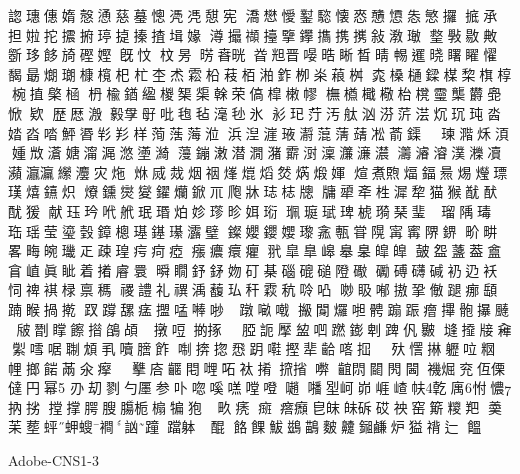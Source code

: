 𧩓璤僡媠慤慂慈𦻒憁凴𠙖憇宪
𣾷𢡟懓𨮝𩥝懐㤲𢦀𢣁怣慜攞
掋𠄘担𡝰拕𢸍捬𤧟㨗搸揸𡎎𡟼
澊𢸶𥜝擡擥鑻㩦携㩗敍漖𤨨
𤨣斅敭敟斵𤥀䬷旑䃘𡠩旣忟
𣐀昘𣇷𣇸晄𣆤𣆥晋𠹵晧𥇦晳晴
𣈱𨗴𣇈𥌓矅𢣷馤朂𤎜𤨡槺𣟂杞
杧杢𤇍𩃭柗䓩栢湐鈼栁𣏦𦶠桝
𣑯槡樋𨫟楳棃𣗍椁椀㨁𣘼㮀
枬楡𨩊䋼椶榘㮡𠏉荣傐槹𣙙𢄪
橅𣜃檝㯳枱櫈𩆜㰍欝𠤣惞欵
歴𢟍溵𣫛𡥘㝀吡𣭚毡𣻼毜氷
𢒋𤣱𦭑汚舦汹𣶼䓅𣶽𤆤𤤌𤤀𣳉
㛥㳫𠴲鮃𣇹𢒑羏样𦴥𦶡𦷫涖
浜湼漄𤥿𤂅𦹲蔳𦽴凇萮𨬡港𣸯
瑓𣾂秌湏媑𣁋濸㜍澝𣸰滺𡒗𤀽
䕕鏰潄潜㵎潴𩅰㴻澟𤅄濓𤂑
𤅕𤀹𣿰𣾴𤄿凟𤅖𤅗𤅀𦇝灋灾炧
烌烕烖烟䄄㷨熴熖𤉷焫煅媈
煊煮𤍥煏鍢𤋁焬𤑚𤨧𤨢熺𨯨炽
爎鑂爕夑鑃爤鍁𥘅爮牀𤥴梽牕
牗㹕𣁄栍漽犂猫𤠣𨠫䣭𨠄猨
献珏玪𠰺𦨮珉瑉𤇢𡛧𤨤昣㛅𤦷
𤦍𤧻珷琕椃𤨦琹㻗瑜𢢭瑠𨺲瑇
珤瑶莹瑬瑴鏱樬璂䥓𤪌𤅟𤩹
𨮏孆𨰃𡢞瓈𡦈甎甞𨻙𡩋寗𨺬鎅
畍畊畧畮𤾂㼄𤴓疎瑝疞疴瘂
瘬癑癏癯𦏵皐臯㟸𦤑𦤎皡皥
皷盌𦾟葢𥂝𥅽𡸜眞眦着撯𥈠睘
𣊬瞯𨥤𨥨𡛁矴棊碯磇磓隥礮
𥗠磗礴碱𧘌辸袄𢘜禆褀椂禀𥡗
禝𧬹礼禩渪𧄦㺨秆𩄍秔唥𠱂
𠴕𥄫喐𢳆㧬𠍁蹆𤶸𩓥𨂾睺𢰸㨴
䟕𨅝𦧲𤷪擝𠵼𠾴𠳕𫪳撍蹾𠺖𠽤
𢲩𨉖𤓓𠵆𩩍𨃩䟴𤺧𢳂骲㩧𩗴
㿭㔆𥋇𩟔𢵄鵮頕𫳗䏙撴哣𢯊㧻
𫥷𦛚𦜖𧦠擪𥁒𠱃蹨𨭌𠜱䠋𠆩㿺
塳𢶍𤗈𠓼𦂗𠽌啹䎺䪴𢩦𡂝膪飵
𠶜捹㧾𢝵跀嚡摼㹃𪘁𠸉𢫏𬗸𡃈
𣧂㦒㨆𨊛㕸𥹉𢃇𢲲𩜠㒼氽𤸻
𬦠𧕴𢺋𢈈𪙛𨳍𠹺𠰴𧘹𢯎𢱑㨘𡃇
𪘲𨳒𨶙𨳊閪𧝞煀兖仾傈㒓円幂
刅刧剹勺㕓参卟唿嗘㗝嘡噔𡁻
𡃓𡋾㞹峁崕嵖㠸亁庽㤔憹抐挘
摚撑腭膄膓栀㮼犏狍𤟯猹畂痜
㿀𤺥㿗皀皌𤽜䂨砹䄃窑簛糭羓
羮苿塟蚲䖬螋襇訩蹱𨆉躰𫐬酞醌
餎餜鮁鷀鶓麬䶑鎺鹻炉獈禙辷
饂

Adobe-CNS1-3

